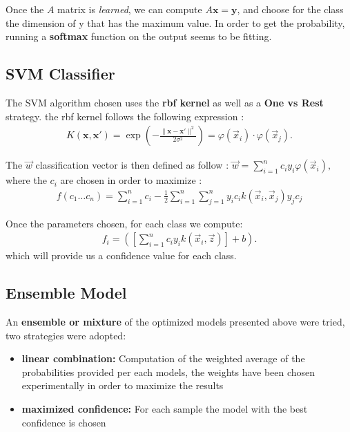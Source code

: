 \documentclass{bioinfo}
\begin{document}
\begin{methods}
Once the $A$ matrix is \textit{learned}, we can compute $A\mathbf {x} =\mathbf {y}$, and choose for the class the dimension of y that has the maximum value. In order to get the probability, running a \textbf{softmax} function on the output seems to be fitting. 

\subsection{SVM Classifier}

The SVM algorithm chosen uses the \textbf{rbf kernel} as well as a  \textbf{One vs Rest} strategy. the rbf kernel follows the following expression : 
\begin{align*}
{\displaystyle K(\mathbf {x} ,\mathbf {x'} )=\exp \left(-{\frac {\|\mathbf {x} -\mathbf {x'} \|^{2}}{2\sigma ^{2}}}\right) =\varphi ({\vec {x}}_{i})\cdot \varphi ({\vec {x}}_{j})}.
\end{align*}

The ${\displaystyle {\vec {w}}}$ classification vector is then defined as follow : ${\displaystyle {\vec {w}}=\sum _{i=1}^{n}c_{i}y_{i}\varphi ({\vec {x}}_{i}),}$ where the $c_{i}$ are chosen in order to maximize :
\begin{align*}
{\displaystyle f(c_{1}\ldots c_{n}) = \sum_{i=1}^{n}c_{i}-{\frac {1}{2}}\sum_{i=1}^{n}\sum_{j=1}^{n}y_{i}c_{i}k({\vec {x}}_{i},{\vec {x}}_{j})y_{j}c_{j}}
\end{align*}

Once the parameters chosen, for each class we compute: 
\begin{align*}
f_i = {\displaystyle \left(\left[\sum _{i=1}^{n}c_{i}y_{i}k({\vec {x}}_{i},{\vec {z}})\right]+b\right).}
\end{align*}
which will provide us a confidence value for each class.\\

\subsection{Ensemble Model}


An \textbf{ensemble or mixture} of the optimized models presented above were tried, two strategies were adopted:
\begin{itemize}
	\item \textbf{linear combination: } Computation of the weighted average of the probabilities provided per each models, the weights have been chosen experimentally in order to maximize the results
	\item \textbf{maximized confidence: } For each sample the model with the best confidence is chosen 
\end{itemize}


\end{methods}
\end{document}
